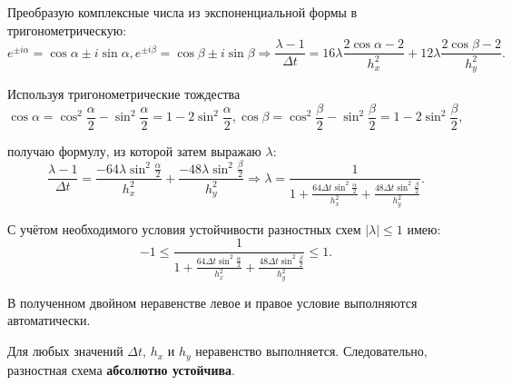 \documentclass[12pt, a4paper]{report}
\begin{document}
	\par
	Преобразую комплексные числа из экспоненциальной формы в тригонометрическую:
	\begin{equation*}
		e^{\pm i \alpha} = \cos{\alpha} \pm i\sin{\alpha}, e^{\pm i \beta} = \cos{\beta} \pm i\sin{\beta} \Rightarrow \frac{\lambda - 1}{\Delta t} = 16\lambda\frac{2\cos{\alpha}-2}{h_{x}^{2}} + 12\lambda\frac{2\cos{\beta}-2}{h_{y}^{2}}.
	\end{equation*}
	\par
	Используя тригонометрические тождества
	\begin{equation*}
		\cos{\alpha} = \cos^{2}{\frac{\alpha}{2}} - \sin^{2}{\frac{\alpha}{2}} = 1 - 2\sin^{2}{\frac{\alpha}{2}}, \cos{\beta} = \cos^{2}{\frac{\beta}{2}} - \sin^{2}{\frac{\beta}{2}} = 1 - 2\sin^{2}{\frac{\beta}{2}},
	\end{equation*}
	\par
	получаю формулу, из которой затем выражаю $\lambda$:
	\begin{equation*}
		\frac{\lambda - 1}{\Delta t} = \frac{-64\lambda\sin^{2}{\frac{\alpha}{2}}}{h_{x}^{2}} + \frac{-48\lambda\sin^{2}{\frac{\beta}{2}}}{h_{y}^{2}} \Rightarrow \lambda = \frac{1}{1 + \frac{64\Delta t\sin^{2}{\frac{\alpha}{2}}}{h_{x}^{2}} + \frac{48\Delta t\sin^{2}{\frac{\beta}{2}}}{h_{y}^{2}}}.
	\end{equation*}
	\par
	С учётом необходимого условия устойчивости разностных схем $\lvert \lambda \rvert \le 1$ имею:
	\begin{equation*}
		-1 \le \frac{1}{1 + \frac{64\Delta t\sin^{2}{\frac{\alpha}{2}}}{h_{x}^{2}} + \frac{48\Delta t\sin^{2}{\frac{\beta}{2}}}{h_{y}^{2}}} \le 1.
	\end{equation*}
	\par
	В полученном двойном неравенстве левое и правое условие выполняются автоматически. \par
	Для любых значений $\Delta t$, $h_{x}$ и $h_{y}$ неравенство выполняется. Следовательно, разностная схема \textbf{абсолютно устойчива}.
\end{document}
